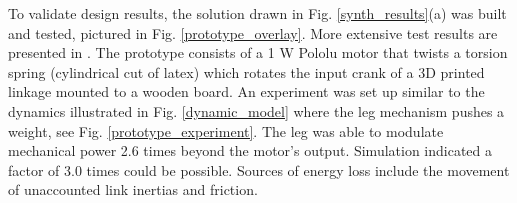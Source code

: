 \documentclass[journal]{IEEEtran}
\begin{document}





To validate design results, the solution drawn in Fig. \ref{synth_results}(a) was built and tested, pictured in Fig. \ref{prototype_overlay}.
More extensive test results are presented in \cite{plecnikAdjustablePowerModulation2019}.
The prototype consists of a 1 W Pololu motor that twists a torsion spring (cylindrical cut of latex) which rotates the input crank of a 3D printed linkage mounted to a wooden board.
An experiment was set up similar to the dynamics illustrated in Fig. \ref{dynamic_model} where the leg mechanism pushes a weight, see Fig. \ref{prototype_experiment}.
The leg was able to modulate mechanical power 2.6 times beyond the motor's output.
Simulation indicated a factor of 3.0 times could be possible.
Sources of energy loss include the movement of unaccounted link inertias and friction.




%
%

\end{document}
